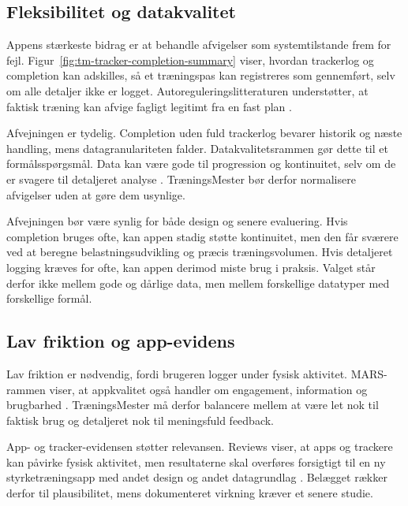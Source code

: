 \subsection{Fleksibilitet og datakvalitet}

Appens stærkeste bidrag er at behandle afvigelser som systemtilstande frem for fejl. Figur~\ref{fig:tm-tracker-completion-summary} viser, hvordan trackerlog og completion kan adskilles, så et træningspas kan registreres som gennemført, selv om alle detaljer ikke er logget. Autoreguleringslitteraturen understøtter, at faktisk træning kan afvige fagligt legitimt fra en fast plan \cite{greig2020_autoregulation_resistance_training}.

Afvejningen er tydelig. Completion uden fuld trackerlog bevarer historik og næste handling, mens datagranulariteten falder. Datakvalitetsrammen gør dette til et formålsspørgsmål. Data kan være gode til progression og kontinuitet, selv om de er svagere til detaljeret analyse \cite{mohammed2025_five_facets_data_quality}. TræningsMester bør derfor normalisere afvigelser uden at gøre dem usynlige.

Afvejningen bør være synlig for både design og senere evaluering. Hvis completion bruges ofte, kan appen stadig støtte kontinuitet, men den får sværere ved at beregne belastningsudvikling og præcis træningsvolumen. Hvis detaljeret logging kræves for ofte, kan appen derimod miste brug i praksis. Valget står derfor ikke mellem gode og dårlige data, men mellem forskellige datatyper med forskellige formål.

\subsection{Lav friktion og app-evidens}

Lav friktion er nødvendig, fordi brugeren logger under fysisk aktivitet. MARS-rammen viser, at appkvalitet også handler om engagement, information og brugbarhed \cite{stoyanov2015_mobile_app_rating_scale}. TræningsMester må derfor balancere mellem at være let nok til faktisk brug og detaljeret nok til meningsfuld feedback.

App- og tracker-evidensen støtter relevansen. Reviews viser, at apps og trackere kan påvirke fysisk aktivitet, men resultaterne skal overføres forsigtigt til en ny styrketræningsapp med andet design og andet datagrundlag \cite{laranjo2021_apps_trackers_meta,romeo2019_smartphone_apps_pa_meta,brickwood2019_wearable_trackers_meta}. Belægget rækker derfor til plausibilitet, mens dokumenteret virkning kræver et senere studie.

